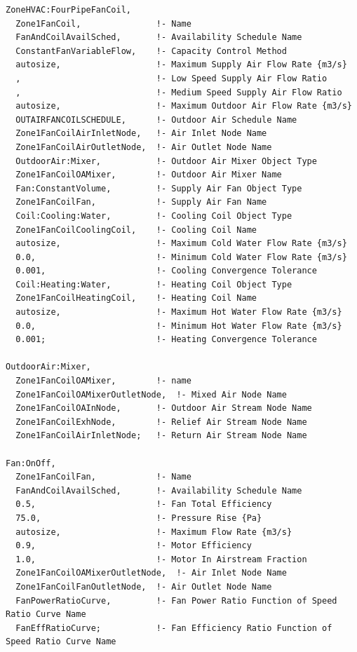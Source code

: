 \begin{lstlisting}
ZoneHVAC:FourPipeFanCoil,
  Zone1FanCoil,               !- Name
  FanAndCoilAvailSched,       !- Availability Schedule Name
  ConstantFanVariableFlow,    !- Capacity Control Method
  autosize,                   !- Maximum Supply Air Flow Rate {m3/s}
  ,                           !- Low Speed Supply Air Flow Ratio
  ,                           !- Medium Speed Supply Air Flow Ratio
  autosize,                   !- Maximum Outdoor Air Flow Rate {m3/s}
  OUTAIRFANCOILSCHEDULE,      !- Outdoor Air Schedule Name
  Zone1FanCoilAirInletNode,   !- Air Inlet Node Name
  Zone1FanCoilAirOutletNode,  !- Air Outlet Node Name
  OutdoorAir:Mixer,           !- Outdoor Air Mixer Object Type
  Zone1FanCoilOAMixer,        !- Outdoor Air Mixer Name
  Fan:ConstantVolume,         !- Supply Air Fan Object Type
  Zone1FanCoilFan,            !- Supply Air Fan Name
  Coil:Cooling:Water,         !- Cooling Coil Object Type
  Zone1FanCoilCoolingCoil,    !- Cooling Coil Name
  autosize,                   !- Maximum Cold Water Flow Rate {m3/s}
  0.0,                        !- Minimum Cold Water Flow Rate {m3/s}
  0.001,                      !- Cooling Convergence Tolerance
  Coil:Heating:Water,         !- Heating Coil Object Type
  Zone1FanCoilHeatingCoil,    !- Heating Coil Name
  autosize,                   !- Maximum Hot Water Flow Rate {m3/s}
  0.0,                        !- Minimum Hot Water Flow Rate {m3/s}
  0.001;                      !- Heating Convergence Tolerance

OutdoorAir:Mixer,
  Zone1FanCoilOAMixer,        !- name
  Zone1FanCoilOAMixerOutletNode,  !- Mixed Air Node Name
  Zone1FanCoilOAInNode,       !- Outdoor Air Stream Node Name
  Zone1FanCoilExhNode,        !- Relief Air Stream Node Name
  Zone1FanCoilAirInletNode;   !- Return Air Stream Node Name

Fan:OnOff,
  Zone1FanCoilFan,            !- Name
  FanAndCoilAvailSched,       !- Availability Schedule Name
  0.5,                        !- Fan Total Efficiency
  75.0,                       !- Pressure Rise {Pa}
  autosize,                   !- Maximum Flow Rate {m3/s}
  0.9,                        !- Motor Efficiency
  1.0,                        !- Motor In Airstream Fraction
  Zone1FanCoilOAMixerOutletNode,  !- Air Inlet Node Name
  Zone1FanCoilFanOutletNode,  !- Air Outlet Node Name
  FanPowerRatioCurve,         !- Fan Power Ratio Function of Speed Ratio Curve Name
  FanEffRatioCurve;           !- Fan Efficiency Ratio Function of Speed Ratio Curve Name


\end{lstlisting}
